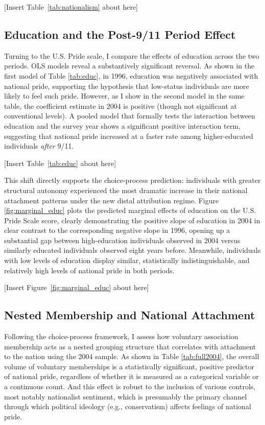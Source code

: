 \documentclass[12pt,letterpaper]{article}
\begin{document}
[Insert Table~\ref{tab:nationalism} about here]

\subsection{Education and the Post-9/11 Period Effect}

Turning to the U.S. Pride scale, I compare the effects of education across the two periods. OLS models reveal a substantively significant reversal. As shown in the first model of Table \ref{tab:educ}, in 1996, education was negatively associated with national pride, supporting the hypothesis that low-status individuals are more likely to feel such pride. However, as I show in the second model in the same table, the coefficient estimate in 2004 is positive (though not significant at conventional levels). A pooled model that formally tests the interaction between education and the survey year shows a significant positive interaction term, suggesting that national pride increased at a faster rate among higher-educated individuals \textit{after} 9/11. 

[Insert Table~\ref{tab:educ} about here]

This shift directly supports the choice-process prediction: individuals with greater structural autonomy experienced the most dramatic increase in their national attachment patterns under the new distal attribution regime. Figure \ref{fig:marginal_educ} plots the predicted marginal effects of education on the U.S. Pride Scale score, clearly demonstrating the positive slope of education in 2004 in clear contrast to the corresponding negative slope in 1996, opening up a substantial gap between high-education individuals observed in 2004 versus similarly educated individuals observed eight years before. Meanwhile, individuals with low levels of education display similar, statistically indistinguishable, and relatively high levels of national pride in both periods. 

[Insert Figure~\ref{fig:marginal_educ} about here]

\subsection{Nested Membership and National Attachment}

Following the choice-process framework, I assess how voluntary association membership acts as a nested grouping structure that correlates with attachment to the nation using the 2004 sample. As shown in Table \ref{tab:full2004}, the overall volume of voluntary memberships is a statistically significant, positive predictor of national pride, regardless of whether it is measured as a categorical variable or a continuous count. And this effect is robust to the inclusion of various controls, most notably nationalist sentiment, which is presumably the primary channel through which political ideology (e.g., conservatism) affects feelings of national pride. 
\end{document}
